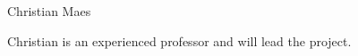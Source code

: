 \begin{participant}[type=PI,PM=12,gender=male,salary=5500]{Christian Maes}

  Christian is an experienced professor and will lead the project.

\end{participant}

